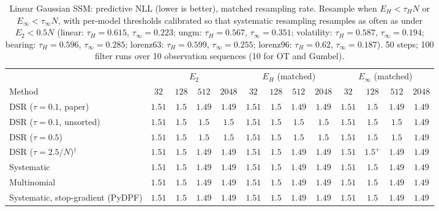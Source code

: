 \begin{table}[ht]
\centering
\small
\caption{Linear Gaussian SSM: predictive NLL (lower is better), matched resampling rate. Resample when $E_H<\tau_HN$ or $E_\infty<\tau_\infty N$, with per-model thresholds calibrated so that systematic resampling resamples as often as under $E_2<0.5N$ (linear: $\tau_H{=}0.615$, $\tau_\infty{=}0.223$; ungm: $\tau_H{=}0.567$, $\tau_\infty{=}0.351$; volatility: $\tau_H{=}0.587$, $\tau_\infty{=}0.194$; bearing: $\tau_H{=}0.596$, $\tau_\infty{=}0.285$; lorenz63: $\tau_H{=}0.599$, $\tau_\infty{=}0.255$; lorenz96: $\tau_H{=}0.62$, $\tau_\infty{=}0.187$). 50 steps; 100 filter runs over 10 observation sequences (10 for OT and Gumbel).}
\label{tab:trigger-matched-linear-predictive_nll}
\begin{adjustbox}{max width=\linewidth}
\begin{tabular}{lcccc|cccc|cccc}
\toprule
 & \multicolumn{4}{c}{$E_2$} & \multicolumn{4}{c}{$E_H$ (matched)} & \multicolumn{4}{c}{$E_\infty$ (matched)} \\
\cmidrule(lr){2-5} \cmidrule(lr){6-9} \cmidrule(lr){10-13}
Method & $32$ & $128$ & $512$ & $2048$ & $32$ & $128$ & $512$ & $2048$ & $32$ & $128$ & $512$ & $2048$ \\
\midrule
DSR ($\tau{=}0.1$, paper) & $1.51$ & $1.5$ & $1.49$ & $1.49$ & $\mathbf{1.51}$ & $1.5$ & $1.49$ & $1.49$ & $1.51$ & $\mathbf{1.5}$ & $\mathbf{1.49}$ & $\mathbf{1.49}$ \\
DSR ($\tau{=}0.1$, unsorted) & $\mathbf{1.51}$ & $1.5$ & $1.5$ & $1.5$ & $1.51$ & $1.5$ & $1.5$ & $1.5$ & $1.51$ & $\mathbf{1.5}$ & $\mathbf{1.5}$ & $\mathbf{1.49}$ \\
DSR ($\tau{=}0.5$) & $1.51$ & $1.5$ & $1.5$ & $1.5$ & $\mathbf{1.51}$ & $1.5$ & $1.5$ & $1.5$ & $1.51$ & $\mathbf{1.5}$ & $\mathbf{1.5}$ & $\mathbf{1.49}$ \\
DSR ($\tau{=}2.5/N$)$^\dagger$ & $1.51$ & $1.5$ & $\mathbf{1.49}$ & $\mathbf{1.49}$ & $1.51$ & $1.5$ & $1.49$ & $1.49$ & $\mathbf{1.51}$ & $\mathbf{1.5}^{+}$ & $1.49$ & $1.49$ \\
\midrule
Systematic & $1.51$ & $1.5$ & $1.49$ & $\mathbf{1.49}$ & $1.51$ & $\mathbf{1.5}$ & $\mathbf{1.49}$ & $1.49$ & $\mathbf{1.51}$ & $1.5$ & $1.49$ & $1.49$ \\
Multinomial & $1.51$ & $1.5$ & $1.49$ & $\mathbf{1.49}$ & $1.51$ & $1.5$ & $1.49$ & $1.49$ & $\mathbf{1.51}$ & $\mathbf{1.5}$ & $\mathbf{1.49}$ & $1.49$ \\
Systematic, stop-gradient (PyDPF) & $1.51$ & $\mathbf{1.5}$ & $\mathbf{1.49}$ & $1.49$ & $\mathbf{1.51}$ & $1.5$ & $1.49$ & $\mathbf{1.49}$ & $1.51$ & $1.5$ & $1.49$ & $1.49$ \\

\end{tabular}
\end{adjustbox}
\end{table}
